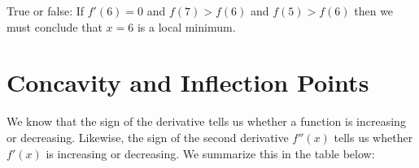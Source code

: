 \documentclass{ximera}
\begin{document}
\begin{question}
True or false: If $f'(6)=0$ and $f(7)>f(6)$ and $f(5)>f(6)$ then we
must conclude that $x=6$ is a local minimum.
    \begin{multipleChoice}
    \end{multipleChoice}  
\end{question}




\section*{Concavity and Inflection Points}

We know that the sign of the derivative tells us whether a function is
increasing or decreasing. Likewise, the sign of the second derivative
$f''(x)$ tells us whether $f'(x)$ is increasing or decreasing. We
summarize this in the table below:
\end{document}
